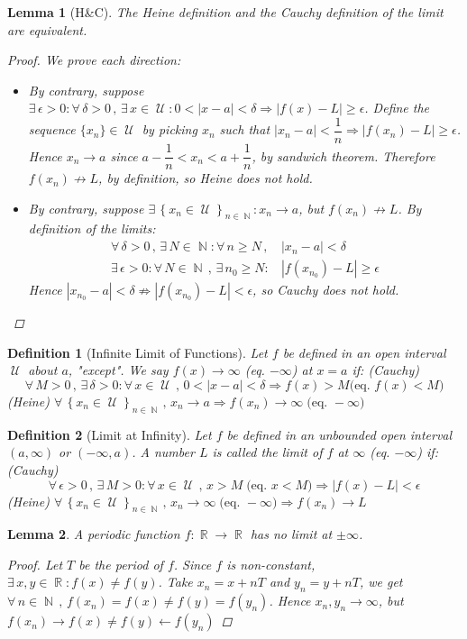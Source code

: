 \documentclass[12pt]{article}
\let\RA\Rightarrow
\let\LA\Leftarrow
\newcommand{\Forall}[1]{\forall\,{#1}\,,\,}
\newcommand{\Exist}[1]{\exists\,{#1}:}
\newcommand{\seq}[2]{\left\{{#1}\right\}_{#2 \in\N}}
\DeclareMathOperator{\N}{\mathbb{N}}
\DeclareMathOperator{\R}{\mathbb{R}}
\DeclareMathOperator{\U}{\mathcal{U}}
\newtheorem{definition}{Definition}[subsection]
\newtheorem{lemma}{Lemma}[subsection]
\begin{document}
\begin{lemma}[H\&C]
  The Heine definition and the Cauchy definition of the limit are equivalent.
  \begin{proof}
    We prove each direction:
    \begin{itemize}
      \item[$(\RA)$] By contrary, suppose $\Exist{\epsilon>0}\Forall{\delta>0}\Exist{x\in\U}0<|x-a|<\delta\RA |f(x)-L|\geq \epsilon$. Define the sequence $\{x_n\}\in\U$ by picking $x_n$ such that $|x_n-a|<\dfrac{1}{n}\RA |f(x_n)-L|\geq \epsilon$. Hence $x_n\to a$ since $a-\dfrac{1}{n}<x_n<a+\dfrac{1}{n}$, by sandwich theorem. Therefore $f(x_n)\not\to L$, by definition, so Heine does not hold.
      \item[$(\LA)$] By contrary, suppose $\Exist{\seq{x_n\in\U}{n}}x_n\to a$, but $f(x_n)\not\to L$. By definition of the limits:
      \begin{align*}
        \Forall{\delta>0}\Exist{N\in\N}\Forall{n\geq N}&|x_n-a|<\delta\\
        \Exist{\epsilon>0}\Forall{N\in\N}\Exist{n_0\geq N}&|f(x_{n_0})-L|\geq \epsilon
      \end{align*}
      Hence $|x_{n_0}-a|<\delta\not\RA|f(x_{n_0})-L|<\epsilon$, so Cauchy does not hold.
    \end{itemize}
  \end{proof}
\end{lemma}

\begin{definition}[Infinite Limit of Functions]
  Let $f$ be defined in an open interval $\U$ about $a$, "except". We say $f(x)\to \infty$ (eq. $-\infty$) at $x=a$ if: (Cauchy) $$\Forall{M>0}\Exist{\delta>0}\Forall{x\in\U}0<|x-a|<\delta\RA f(x)>M \big(\text{eq. }f(x)<M\big)$$
  (Heine) $\Forall{\seq{x_n\in\U}{n}} x_n\to a \RA f(x_n)\to \infty\;\big(\text{eq. }-\infty\big)$
\end{definition}

\begin{definition}[Limit at Infinity]
  Let $f$ be defined in an unbounded open interval $(a,\infty)$ or $(-\infty,a)$. A number $L$ is called the limit of $f$ at $\infty$ (eq. $-\infty$) if: (Cauchy) $$\Forall{\epsilon>0}\Exist{M>0}\Forall{x\in\U}x>M\;\big(\text{eq. }x<M\big)\RA |f(x)-L|<\epsilon$$
  (Heine) $\Forall{\seq{x_n\in\U}{n}} x_n\to \infty \;\big(\text{eq. }-\infty\big) \RA f(x_n)\to L$
\end{definition}

\begin{lemma}
  A periodic function $f:\R\to\R$ has no limit at $\pm\infty$.
  \begin{proof}
    Let $T$ be the period of $f$. Since $f$ is non-constant, $\Exist{x,y\in\R}f(x)\neq f(y)$. Take $x_n=x+nT$ and $y_n=y+nT$, we get $\Forall{n\in\N} f(x_n)=f(x)\neq f(y)=f(y_n)$. Hence $x_n,y_n\to\infty$, but $f(x_n)\to f(x)\neq f(y)\leftarrow f(y_n)$
  \end{proof}
\end{lemma}
\end{document}
